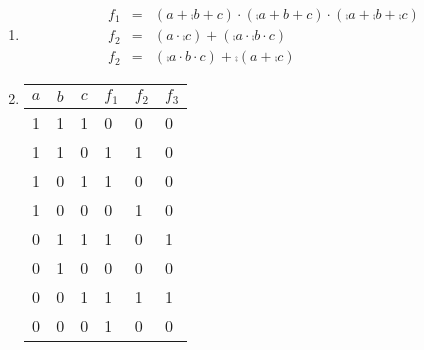 \documentclass{CInf_practice}
\begin{document}
\begin{enumerate}[label=\alph{*})]
   \item 
      \begin{eqnarray*}
         f_1 & = & (a + \comp b + c) \cdot (\comp a + b + c) \cdot (\comp a + \comp b + \comp c)\\
         f_2 & = & (a \cdot \comp c) + (\comp a \cdot \comp b \cdot c) \\
         f_2 & = & (\comp a \cdot b \cdot c) + \comp{(a + \comp c)}
      \end{eqnarray*}
   \item \hspace{\linewidth}

      \begin{tabular}{ccc|lll}
         $a$ & $b$ & $c$ & $f_1$ & $f_2$ & $f_3$\\\hline
         1 & 1 & 1 & 0&0&0\\
         1 & 1 & 0 & 1&1&0\\
         1 & 0 & 1 & 1&0&0\\
         1 & 0 & 0 & 0&1&0\\
         0 & 1 & 1 & 1&0&1\\
         0 & 1 & 0 & 0&0&0\\
         0 & 0 & 1 & 1&1&1\\
         0 & 0 & 0 & 1&0&0\\
      \end{tabular}
\end{enumerate}
\end{document}
